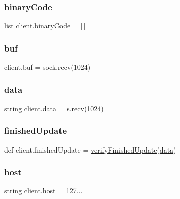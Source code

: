 \mbox{\label{namespaceclient_abf9b35467956bfa36acd984aace33449}} 
\subsubsection{\texorpdfstring{binary\+Code}{binaryCode}}
{\footnotesize\ttfamily list client.\+binary\+Code = \mbox{[}$\,$\mbox{]}}

\mbox{\label{namespaceclient_a09b2af09e6bb63b2b014637b5b4e2936}} 
\subsubsection{\texorpdfstring{buf}{buf}}
{\footnotesize\ttfamily client.\+buf = sock.\+recv(1024)}

\mbox{\label{namespaceclient_ade2c74246e97a6a8badb63b11888eb96}} 
\subsubsection{\texorpdfstring{data}{data}}
{\footnotesize\ttfamily string client.\+data = s.\+recv(1024)}

\mbox{\label{namespaceclient_acb1b64fab7439cf2fdc191f31daa8353}} 
\subsubsection{\texorpdfstring{finished\+Update}{finishedUpdate}}
{\footnotesize\ttfamily def client.\+finished\+Update = \hyperlink{namespaceclient_aa133740df708d11451616cdd39a08b91}{verify\+Finished\+Update}(\hyperlink{namespaceclient_ade2c74246e97a6a8badb63b11888eb96}{data})}

\mbox{\label{namespaceclient_affd1b2de2616b92fa875ddb4f94f21a0}} 
\subsubsection{\texorpdfstring{host}{host}}
{\footnotesize\ttfamily string client.\+host = \textquotesingle{}127...\textquotesingle{}}

